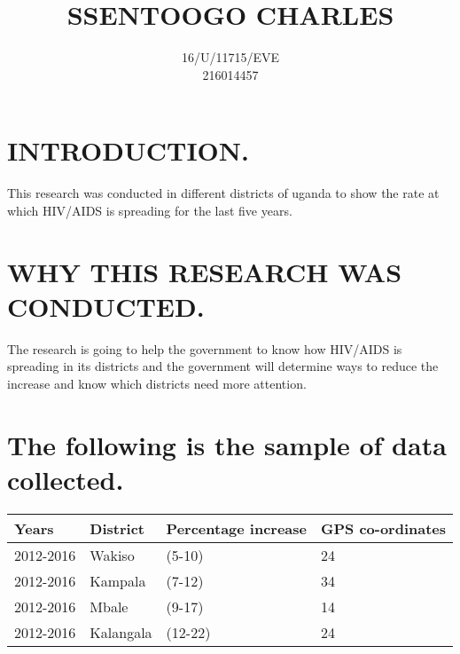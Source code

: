 \documentclass[20pt]{article}
\title{\textbf{SSENTOOGO CHARLES}}
\author{16/U/11715/EVE\\216014457\\}
\date{}
\begin{document}

\section{INTRODUCTION.}

This research was conducted in different districts of uganda to show the rate at which HIV/AIDS is spreading for the last five years. 



\section{ WHY THIS RESEARCH WAS CONDUCTED.}
The research is going to help the government to know how HIV/AIDS is spreading in its districts and the government will determine ways to reduce the increase and know which districts need more attention.

\section{The following is the sample of data collected.}
\begin{tabular}{|l|l|l|l|}
\hline
	Years & District & Percentage increase& GPS co-ordinates\\
\hline
	2012-2016 & Wakiso & (5-10) & 24\\
\hline
	2012-2016 & Kampala & (7-12)& 34\\
\hline
	2012-2016 & Mbale & (9-17) & 14\\
\hline
	2012-2016 & Kalangala& (12-22) & 24\\
\hline
\end{tabular}
  
\end{document}
